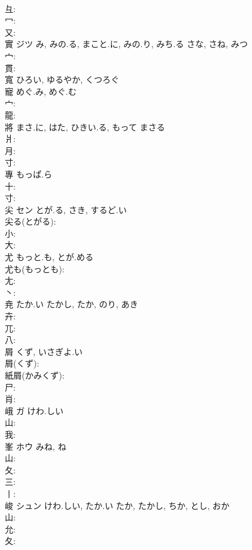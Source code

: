 \documentclass[8pt]{extreport}
\begin{document}
\begin{CJK}{UTF8}{min}
\\	彑: 
\\	冖: 
\\	又: 
\\	實	ジツ	み, みの.る, まこと.に, みの.り, みち.る	さな, さね, みつ	
\\	宀: 
\\	貫: 
\\	寬		ひろい, ゆるやか, くつろぐ				
\\	寵		めぐ.み, めぐ.む			
\\	宀: 
\\	龍: 
\\	將		まさ.に, はた, ひきい.る, もって	まさる			
\\	爿: 
\\	月: 
\\	寸: 
\\	專		もっぱ.ら				
\\	十: 
\\	寸: 
\\	尖	セン	とが.る, さき, するど.い		
\\	尖る(とがる): 
\\	小: 
\\	大: 
\\	尤		もっと.も, とが.める			
\\	尤も(もっとも): 
\\	尢: 
\\	丶: 
\\	尭		たか.い	たかし, たか, のり, あき		
\\	卉: 
\\	兀: 
\\	八: 
\\	屑		くず, いさぎよ.い			
\\	屑(くず): 
\\	紙屑(かみくず): 
\\	尸: 
\\	肖: 
\\	峨	ガ	けわ.しい		
\\	山: 
\\	我: 
\\	峯	ホウ	みね, ね		
\\	山: 
\\	夂: 
\\	三: 
\\	丨: 
\\	峻	シュン	けわ.しい, たか.い	たか, たかし, ちか, とし, おか	
\\	山: 
\\	允: 
\\	夂: 

\end{CJK}
\end{document}
